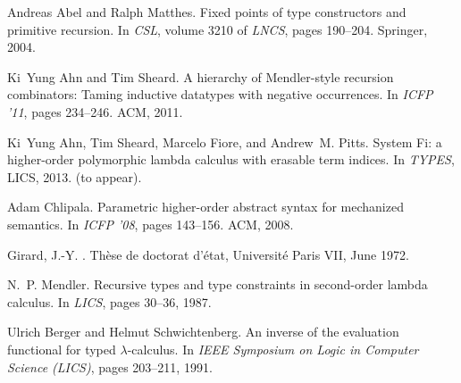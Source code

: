 \documentclass[a4paper]{easychair} %
\begin{document}
\begin{comment}
 \item Prove that \textsf{MPrIx} terminates whenever it is well defined.
 \vspace*{-1ex}
\end{itemize}
\vspace{-1ex}
\end{comment}

\begin{thebibliography}{1}
\vspace*{-1ex}
Andreas Abel and Ralph Matthes.
\newblock Fixed points of type constructors and primitive recursion.
\newblock In {\em CSL}, volume 3210 of {\em LNCS}, pages 190--204. Springer,
  2004.

Ki~Yung Ahn and Tim Sheard.
\newblock A hierarchy of {M}endler-style recursion combinators: {T}aming
  inductive datatypes with negative occurrences.
\newblock In {\em ICFP '11}, pages 234--246. ACM, 2011.

Ki~Yung Ahn, Tim Sheard, Marcelo Fiore, and Andrew~M. Pitts.
\newblock System {F}i: a higher-order polymorphic lambda calculus with erasable
  term indices.
\newblock In {\em TYPES}, LICS, 2013.
\newblock (to appear).

Adam Chlipala.
\newblock Parametric higher-order abstract syntax for mechanized semantics.
\newblock In {\em ICFP '08}, pages 143--156. ACM, 2008.

{Girard, J.-Y.}
.
\newblock Th\`{e}se de doctorat d'\'{e}tat, Universit\'{e} Paris VII, June
  1972.

N.~P. Mendler.
\newblock Recursive types and type constraints in second-order lambda calculus.
\newblock In {\em LICS}, pages 30--36, 1987.


Ulrich Berger and Helmut Schwichtenberg.
\newblock An inverse of the evaluation functional for typed $\lambda$-calculus.
\newblock In {\em {IEEE} Symposium on Logic in Computer Science ({LICS})},
  pages 203--211, 1991.
\end{thebibliography}
\end{document}
